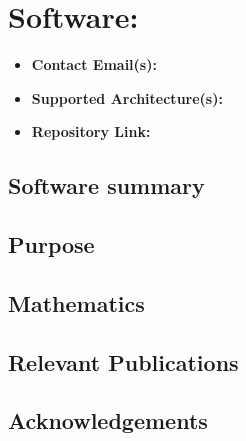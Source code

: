 \section{Software: }
\label{sec:\VAR{software.name}:software}



\begin{itemize}
    \item \textbf{Contact Email(s):} 
    \item \textbf{Supported Architecture(s):} 
    \item \textbf{Repository Link:} \href{\VAR{software.repository}}{}
\end{itemize}

\subsection{Software summary}
\label{sec:\VAR{software.name}:summary}



\subsection{Purpose}
\label{sec:\VAR{software.name}:purpose}



\subsection{Mathematics}
\label{sec:\VAR{software.name}:mathematics}


\subsection{Relevant Publications}
\label{sec:\VAR{software.name}:publications}

\subsection{Acknowledgements}
\label{sec::\VAR{software.name}:acknowledgements}




